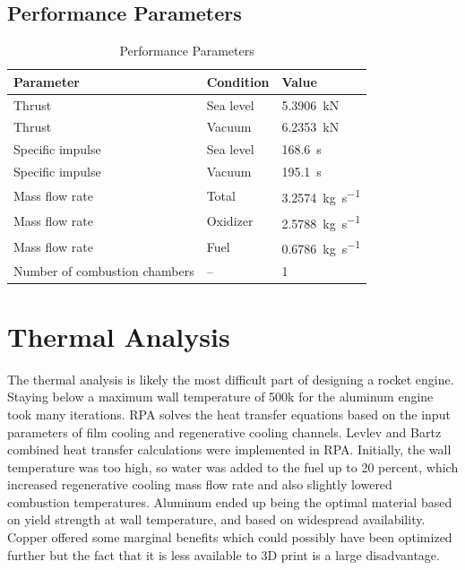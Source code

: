 \subsection{Performance Parameters}
\begin{table}[H]
    \centering
    \begin{tabular}{|l|l|l|}
        \hline
        \textbf{Parameter} & \textbf{Condition} & \textbf{Value} \\ \hline
        Thrust & Sea level & \SI{5.3906}{\kilo\newton} \\ \hline
        Thrust & Vacuum & \SI{6.2353}{\kilo\newton} \\ \hline
        Specific impulse & Sea level & \SI{168.6}{\second} \\ \hline
        Specific impulse & Vacuum & \SI{195.1}{\second} \\ \hline
        Mass flow rate & Total & \SI{3.2574}{\kilogram\per\second} \\ \hline
        Mass flow rate & Oxidizer & \SI{2.5788}{\kilogram\per\second} \\ \hline
        Mass flow rate & Fuel & \SI{0.6786}{\kilogram\per\second} \\ \hline
        Number of combustion chambers & -- & 1 \\ \hline
    \end{tabular}
    \caption{Performance Parameters}
\end{table}





\section{Thermal Analysis}
The thermal analysis is likely the most difficult part of designing a rocket engine. Staying below a maximum wall temperature of 500k for the aluminum engine took many iterations. RPA solves the heat transfer equations based on the input parameters of film cooling and regenerative cooling channels. Levlev and Bartz combined heat transfer calculations were implemented in RPA.
Initially, the wall temperature was too high, so water was added to the fuel up to 20 percent, which increased regenerative cooling mass flow rate and also slightly lowered combustion temperatures. 
Aluminum ended up being the optimal material based on yield strength at wall temperature, and based on widespread availability.
Copper offered some marginal benefits which could possibly have been optimized further but the fact that it is less available to 3D print is a large disadvantage. 



